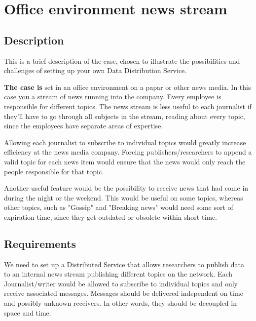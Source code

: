 \chapter{Office environment news stream}
\section{Description}
This is a brief description of the case, chosen to illustrate the possibilities and challenges of setting up your own Data Distribution Service.

\textbf{The case is}
set in an office environment on a papar or other news media. In this case you a stream of news running into the company. Every employee is responsible for different topics.
The news stream is less useful to each journalist if they'll have to go through all subjects in the stream, reading about every topic, since the employees have separate areas of expertise. 

Allowing each journalist to subscribe to individual topics would greatly increase efficiency at the news media company. Forcing publishers/researchers to append a valid topic for each news item would ensure that the news would only reach the people responsible for that topic.

Another useful feature would be the possibility to receive news that had come in during the night or the weekend. This would be useful on some topics, whereas other topics, such as "Gossip" and "Breaking news" would need some sort of expiration time, since they get outdated or obsolete within short time.

\section{Requirements}
We need to set up a Distributed Service that allows researchers to publish data to an internal news stream publishing different topics on the network. Each Journalist/writer would be allowed to subscribe to individual topics and only receive associated messages.
Messages should be delivered independent on time and possibly unknown receivers. In other words, they should be decoupled in space and time.
